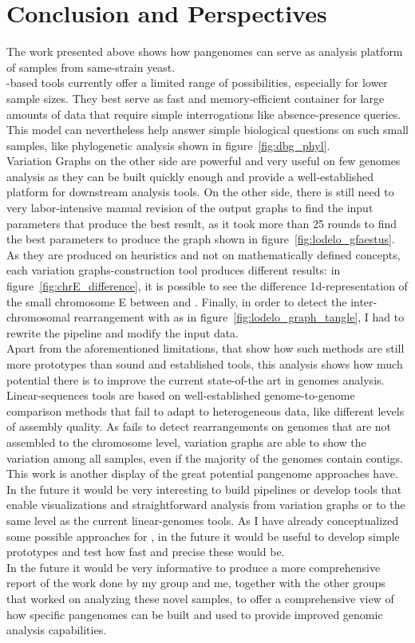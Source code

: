 \section{Conclusion and Perspectives}
The work presented above shows how pangenomes can serve as analysis platform of samples from same-strain yeast. \\
\dbg-based tools currently offer a limited range of possibilities, especially for lower sample sizes. They best serve as fast and memory-efficient container for large amounts of data that require simple interrogations like absence-presence queries. This model can nevertheless help answer simple biological questions on such small samples, like phylogenetic analysis shown in figure~\ref{fig:dbg_phyl}.\\
Variation Graphs on the other side are powerful and very useful on few genomes analysis as they can be built quickly enough and provide a well-established platform for downstream analysis tools. On the other side, there is still need to very labor-intensive manual revision of the output graphs to find the input parameters that produce the best result, as it took more than 25 rounds to find the best \pggb parameters to produce the graph shown in figure~\ref{fig:lodelo_gfaestus}. As they are produced on heuristics and not on mathematically defined concepts, each variation graphs-construction tool produces different results: in figure~\ref{fig:chrE_difference}, it is possible to see the difference 1d-representation of the small chromosome E between \pggb and \mcactus. Finally, in order to detect the inter-chromosomal rearrangement with \mcactus as in figure~\ref{fig:lodelo_graph_tangle}, I had to rewrite the pipeline and modify the input data. \\
Apart from the aforementioned limitations, that show how such methods are still more prototypes than sound and established tools, this analysis shows how much potential there is to improve the current state-of-the art in genomes analysis. Linear-sequences tools are based on well-established genome-to-genome comparison methods that fail to adapt to heterogeneous data, like different levels of assembly quality. As \syri fails to detect rearrangements on genomes that are not assembled to the chromosome level, variation graphs are able to show the variation among all samples, even if the majority of the genomes contain contigs. \\
This work is another display of the great potential pangenome approaches have. In the future it would be very interesting to build pipelines or develop tools that enable visualizations and straightforward analysis from variation graphs or \ccdbgs to the same level as the current linear-genomes tools. As I have already conceptualized some possible approaches for \ccdbgs, in the future it would be useful to develop simple prototypes and test how fast and precise these would be.\\
In the future it would be very informative to produce a more comprehensive report of the work done by my group and me, together with the other groups that worked on analyzing these novel \lodelo samples, to offer a comprehensive view of how specific pangenomes can be built and used to provide improved genomic analysis capabilities.

